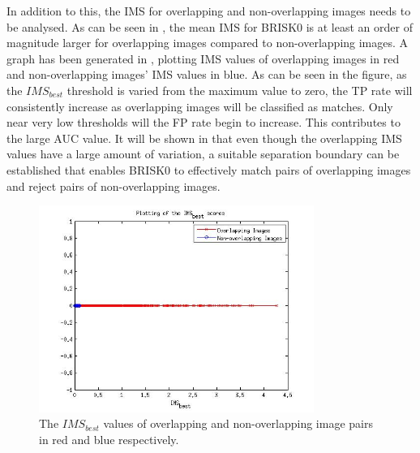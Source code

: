 \documentclass{report}
\begin{document}
In addition to this, the IMS for overlapping and non-overlapping images needs to be analysed. As can be seen in , the mean IMS for BRISK0 is at least an order of magnitude larger for overlapping images compared to non-overlapping images. A graph has been generated in , plotting IMS values of overlapping images in red and non-overlapping images' IMS values in blue. As can be seen in the figure, as the $IMS_{best}$ threshold is varied from the maximum value to zero, the TP rate will consistently increase as overlapping images will be classified as matches. Only near very low thresholds will the FP rate begin to increase. This contributes to the large AUC value. It will be shown in  that even though the overlapping IMS values have a large amount of variation, a suitable separation boundary can be established that enables BRISK0 to effectively match pairs of overlapping images and reject pairs of non-overlapping images.\\

\begin{figure}
  \centering
    \includegraphics[width=0.8\textwidth]{../Drawings/Matching/MatchingScore_BRISK0.jpg}
    \caption{The $IMS_{best}$ values of overlapping and non-overlapping image pairs in red and blue respectively.} 
    \label{fig:ms_brisk0}
\end{figure}
\end{document}
